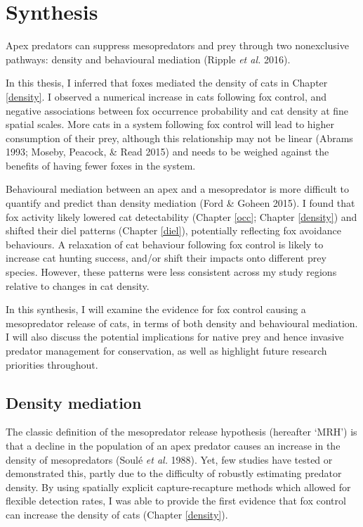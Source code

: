 \documentclass[11pt,a4paper,titlepage,twoside,openright]{style/unimelbthesis}
\begin{document}
\begin{mainmatter}
\hypertarget{synthesis}{%
\chapter{Synthesis}\label{synthesis}}

Apex predators can suppress mesopredators and prey through two nonexclusive pathways: density and behavioural mediation (Ripple \emph{et al.} 2016).

In this thesis, I inferred that foxes mediated the density of cats in Chapter \ref{density}. I observed a numerical increase in cats following fox control, and negative associations between fox occurrence probability and cat density at fine spatial scales. More cats in a system following fox control will lead to higher consumption of their prey, although this relationship may not be linear (Abrams 1993; Moseby, Peacock, \& Read 2015) and needs to be weighed against the benefits of having fewer foxes in the system.

Behavioural mediation between an apex and a mesopredator is more difficult to quantify and predict than density mediation (Ford \& Goheen 2015). I found that fox activity likely lowered cat detectability (Chapter \ref{occ}; Chapter \ref{density}) and shifted their diel patterns (Chapter \ref{diel}), potentially reflecting fox avoidance behaviours. A relaxation of cat behaviour following fox control is likely to increase cat hunting success, and/or shift their impacts onto different prey species. However, these patterns were less consistent across my study regions relative to changes in cat density.

In this synthesis, I will examine the evidence for fox control causing a mesopredator release of cats, in terms of both density and behavioural mediation. I will also discuss the potential implications for native prey and hence invasive predator management for conservation, as well as highlight future research priorities throughout.

\hypertarget{density-mediation}{%
\section{Density mediation}\label{density-mediation}}

The classic definition of the mesopredator release hypothesis (hereafter `MRH') is that a decline in the population of an apex predator causes an increase in the density of mesopredators (Soulé \emph{et al.} 1988). Yet, few studies have tested or demonstrated this, partly due to the difficulty of robustly estimating predator density. By using spatially explicit capture-recapture methods which allowed for flexible detection rates, I was able to provide the first evidence that fox control can increase the density of cats (Chapter \ref{density}).


\end{mainmatter}
\end{document}
